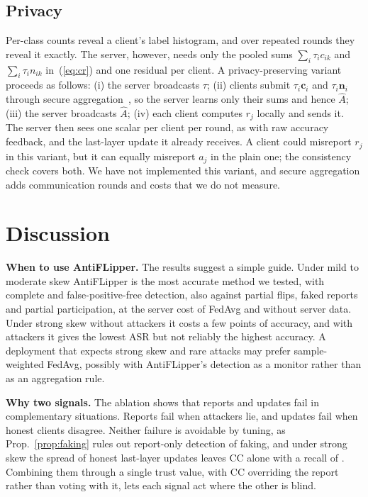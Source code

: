 \documentclass[journal]{IEEEtran}
\begin{document}
\subsection{Privacy}
\label{sec:privacy}
Per-class counts reveal a client's label histogram, and over repeated rounds they reveal it exactly. The server, however, needs only the pooled sums $\sum_i\tau_ic_{ik}$ and $\sum_i\tau_in_{ik}$ in~(\ref{eq:cr}) and one residual per client. A privacy-preserving variant proceeds as follows: (i) the server broadcasts $\tau$; (ii) clients submit $\tau_i\mathbf{c}_i$ and $\tau_i\mathbf{n}_i$ through secure aggregation~\cite{bonawitz2017practical}, so the server learns only their sums and hence $\hat A$; (iii) the server broadcasts $\hat A$; (iv) each client computes $r_j$ locally and sends it. The server then sees one scalar per client per round, as with raw accuracy feedback, and the last-layer update it already receives. A client could misreport $r_j$ in this variant, but it can equally misreport $a_j$ in the plain one; the consistency check covers both. We have not implemented this variant, and secure aggregation adds communication rounds and costs that we do not measure.

\section{Discussion}
\label{sec:discussion}
\textbf{When to use AntiFLipper.} The results suggest a simple guide. Under mild to moderate skew AntiFLipper is the most accurate method we tested, with complete and false-positive-free detection, also against partial flips, faked reports and partial participation, at the server cost of FedAvg and without server data. Under strong skew without attackers it costs a few points of accuracy, and with attackers it gives the lowest ASR but not reliably the highest accuracy. A deployment that expects strong skew and rare attacks may prefer sample-weighted FedAvg, possibly with AntiFLipper's detection as a monitor rather than as an aggregation rule.

\textbf{Why two signals.} The ablation shows that reports and updates fail in complementary situations. Reports fail when attackers lie, and updates fail when honest clients disagree. Neither failure is avoidable by tuning, as Prop.~\ref{prop:faking} rules out report-only detection of faking, and under strong skew the spread of honest last-layer updates leaves CC alone with a recall of \ccSkewRecall. Combining them through a single trust value, with CC overriding the report rather than voting with it, lets each signal act where the other is blind.
\end{document}
